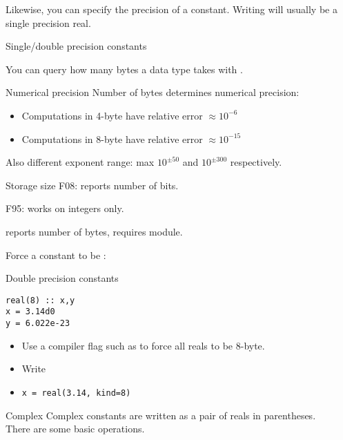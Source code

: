 Likewise, you can specify the precision of a constant.
Writing  will usually be a single precision
real. 

\begin{block}{Single/double precision constants}
  \label{sl:fsingledouble}
\end{block}

You can query how many bytes a data type takes with
.

\begin{block}{Numerical precision}
  \label{sl:fprecision48}
  Number of bytes determines numerical precision:
  \begin{itemize}
  \item Computations in 4-byte have relative error $\approx 10^{-6}$
  \item Computations in 8-byte have relative error $\approx 10^{-15}$
  \end{itemize}
  Also different exponent range: max $10^{\pm 50}$ and $10^{\pm 300}$ respectively.
\end{block}

\begin{block}{Storage size}
  F08:  reports number of bits.

  F95:  works on integers only.

   reports number of bytes, requires
   module.
\end{block}

Force a constant to be :
\begin{block}{Double precision constants}
  \label{sl:fdouble}
\begin{lstlisting}
real(8) :: x,y
x = 3.14d0
y = 6.022e-23
\end{lstlisting}
  \begin{itemize}
  \item Use a compiler flag such as  to force all reals to be 8-byte.
  \item Write 
  \item \verb+x = real(3.14, kind=8)+
  \end{itemize}
\end{block}

\begin{block}{Complex}
  \label{sl:fcomplex}
  Complex constants are written as a pair of reals in parentheses.\\
  There are some basic operations.
\end{block}

